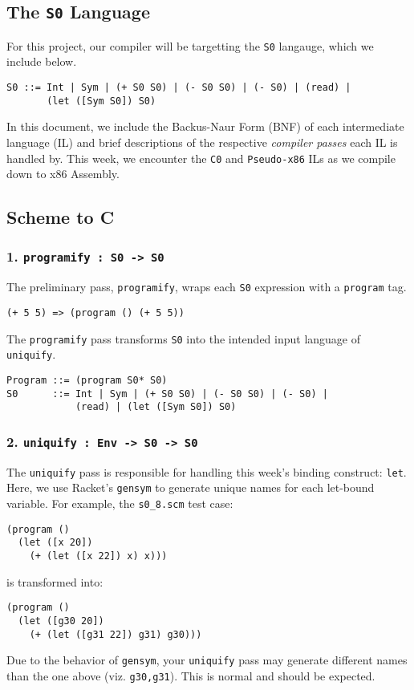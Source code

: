 \documentclass[12pt]{article}
\begin{document}
\maketitle

\subsection*{The {\tt S0} Language}
For this project, our compiler will be targetting the {\tt S0} langauge, which
we include below.

\begin{verbatim}
S0 ::= Int | Sym | (+ S0 S0) | (- S0 S0) | (- S0) | (read) | 
       (let ([Sym S0]) S0)
\end{verbatim}

In this document, we include the Backus-Naur Form (BNF) of each intermediate
language (IL) and brief descriptions of the respective \textit{compiler passes}
each IL is handled by. This week, we encounter the {\tt C0} and {\tt Pseudo-x86}
ILs as we compile down to x86 Assembly.

\subsection*{Scheme to C}
\subsubsection*{1. {\tt programify : S0 -> S0}}
The preliminary pass, {\tt programify}, wraps each {\tt S0} expression with a
{\tt program} tag.
\begin{verbatim}
(+ 5 5) => (program () (+ 5 5))
\end{verbatim}

The {\tt programify} pass transforms {\tt S0} into the intended input language
of {\tt uniquify}.

\begin{verbatim}
Program ::= (program S0* S0) 
S0      ::= Int | Sym | (+ S0 S0) | (- S0 S0) | (- S0) | 
            (read) | (let ([Sym S0]) S0)
\end{verbatim}

\subsubsection*{2. {\tt uniquify : Env -> S0 -> S0}}
The {\tt uniquify} pass is responsible for handling this week's binding
construct: {\tt let}. Here, we use Racket's {\tt gensym} to generate unique
names for each let-bound variable. For example, the {\tt s0\_8.scm} test case:
\begin{verbatim}
(program ()
  (let ([x 20])
    (+ (let ([x 22]) x) x)))
\end{verbatim}
is transformed into:
\begin{verbatim}
(program ()
  (let ([g30 20])
    (+ (let ([g31 22]) g31) g30)))
\end{verbatim}
Due to the behavior of {\tt gensym}, your {\tt uniquify} pass may generate
different names than the one above (viz. {\tt g30,g31}). This is normal and
should be expected.
\end{document}
